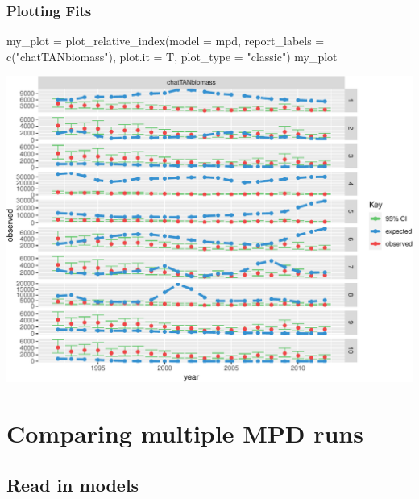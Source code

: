 \documentclass[
]{book}
\newenvironment{Shaded}{\begin{snugshade}}{\end{snugshade}}
\newcommand{\AttributeTok}[1]{\textcolor[rgb]{0.77,0.63,0.00}{#1}}
\newcommand{\FunctionTok}[1]{\textcolor[rgb]{0.00,0.00,0.00}{#1}}
\newcommand{\NormalTok}[1]{#1}
\newcommand{\OtherTok}[1]{\textcolor[rgb]{0.56,0.35,0.01}{#1}}
\newcommand{\StringTok}[1]{\textcolor[rgb]{0.31,0.60,0.02}{#1}}
\begin{document}
\hypertarget{plotting-fits-1}{%
\subsection*{Plotting Fits}\label{plotting-fits-1}}

\begin{Shaded}
\begin{Highlighting}[]
\NormalTok{my\_plot }\OtherTok{=} \FunctionTok{plot\_relative\_index}\NormalTok{(}\AttributeTok{model =}\NormalTok{ mpd, }\AttributeTok{report\_labels =} \FunctionTok{c}\NormalTok{(}\StringTok{"chatTANbiomass"}\NormalTok{), }\AttributeTok{plot.it =}\NormalTok{ T, }\AttributeTok{plot\_type =} \StringTok{"classic"}\NormalTok{)}
\NormalTok{my\_plot}
\end{Highlighting}
\end{Shaded}

\includegraphics{_main_files/figure-latex/plot_relative_index_multi-1.pdf}

\hypertarget{summarisemultipleinputs}{%
\chapter{Comparing multiple MPD runs}\label{summarisemultipleinputs}}

\hypertarget{read-in-models}{%
\section{Read in models}\label{read-in-models}}
\end{document}
